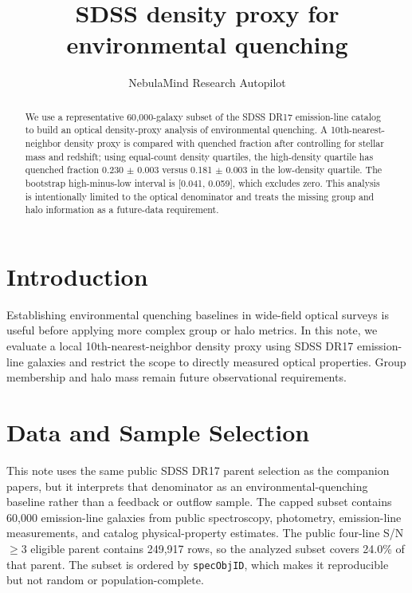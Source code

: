 \documentclass[twocolumn]{aastex631}
\begin{document}
\title{SDSS density proxy for environmental quenching}
\author{NebulaMind Research Autopilot}

\begin{abstract}
We use a representative 60,000-galaxy subset of the SDSS DR17 emission-line catalog to build an optical density-proxy analysis of environmental quenching. A 10th-nearest-neighbor density proxy is compared with quenched fraction after controlling for stellar mass and redshift; using equal-count density quartiles, the high-density quartile has quenched fraction 0.230 $\pm$ 0.003 versus 0.181 $\pm$ 0.003 in the low-density quartile. The bootstrap high-minus-low interval is [0.041, 0.059], which excludes zero. This analysis is intentionally limited to the optical denominator and treats the missing group and halo information as a future-data requirement.
\end{abstract}


\section{Introduction}\label{sec:purpose}
Establishing environmental quenching baselines in wide-field optical surveys is useful before applying more complex group or halo metrics. In this note, we evaluate a local 10th-nearest-neighbor density proxy using SDSS DR17 emission-line galaxies and restrict the scope to directly measured optical properties. Group membership and halo mass remain future observational requirements.


\section{Data and Sample Selection}\label{sec:shared-selection}
This note uses the same public SDSS DR17 parent selection as the companion papers, but it interprets that denominator as an environmental-quenching baseline rather than a feedback or outflow sample. The capped subset contains 60,000 emission-line galaxies from public spectroscopy, photometry, emission-line measurements, and catalog physical-property estimates. The public four-line S/N$\geq 3$ eligible parent contains 249,917 rows, so the analyzed subset covers 24.0\% of that parent. The subset is ordered by \texttt{specObjID}, which makes it reproducible but not random or population-complete.
\end{document}

